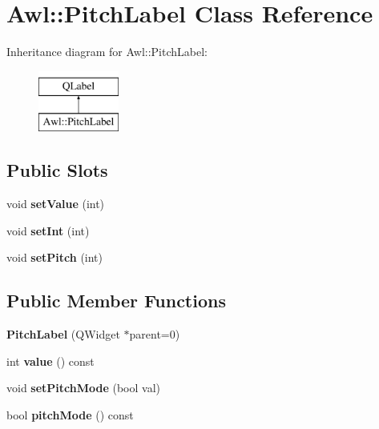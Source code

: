 \hypertarget{class_awl_1_1_pitch_label}{}\section{Awl\+:\+:Pitch\+Label Class Reference}
\label{class_awl_1_1_pitch_label}
Inheritance diagram for Awl\+:\+:Pitch\+Label\+:\begin{figure}[H]
\begin{center}
\leavevmode
\includegraphics[height=2.000000cm]{class_awl_1_1_pitch_label}
\end{center}
\end{figure}
\subsection*{Public Slots}
\begin{DoxyCompactItemize}
\item 
\mbox{\label{class_awl_1_1_pitch_label_a120067578adea86d615d5222c8d6e2ae}} 
void {\bfseries set\+Value} (int)
\item 
\mbox{\label{class_awl_1_1_pitch_label_a8b51be7f04d34ec740b18560fd896f30}} 
void {\bfseries set\+Int} (int)
\item 
\mbox{\label{class_awl_1_1_pitch_label_a02d2702e5be5305ce92cddfb804f78d0}} 
void {\bfseries set\+Pitch} (int)
\end{DoxyCompactItemize}
\subsection*{Public Member Functions}
\begin{DoxyCompactItemize}
\item 
\mbox{\label{class_awl_1_1_pitch_label_aa7470e092ba312973e0d0337e9cf9f43}} 
{\bfseries Pitch\+Label} (Q\+Widget $\ast$parent=0)
\item 
\mbox{\label{class_awl_1_1_pitch_label_af0aac2a560097ed601982577f4924357}} 
int {\bfseries value} () const
\item 
\mbox{\label{class_awl_1_1_pitch_label_afacf0e88871576b3ded0cdd2a17da404}} 
void {\bfseries set\+Pitch\+Mode} (bool val)
\item 
\mbox{\label{class_awl_1_1_pitch_label_ac58d8715b6b93ddac4d7d8851a3841fb}} 
bool {\bfseries pitch\+Mode} () const
\end{DoxyCompactItemize}
